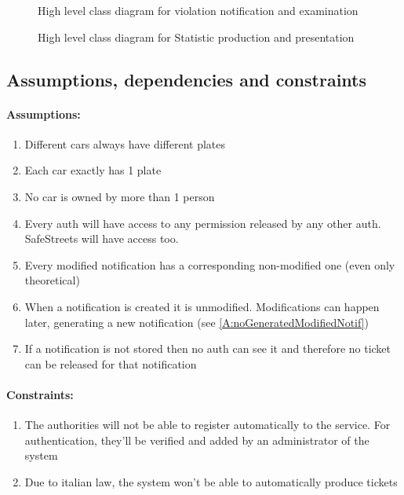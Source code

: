 \documentclass{article}
\newcommand{\enum}[1]{\texttt{#1.\arabic*}}
\begin{document}
		\begin{figure}[H]
			\centering
			\def\svgwidth{\columnwidth}
			
		\caption{High level class diagram for violation notification and examination}
		\end{figure}
				
		\begin{figure}[H]
			\centering
			\def\svgwidth{\columnwidth}
			
		\caption{High level class diagram for Statistic production and presentation}
		\end{figure}
			
	
	\subsection{Assumptions, dependencies and constraints}
	
	\paragraph{Assumptions:}
		\begin{enumerate}[label=\enum{A}]
			\item \label{A:disjPlates} Different cars always have different plates
			\item \label{A:Single plate}Each car exactly has 1 plate
			\item \label{A:singleOwner}No car is owned by more than 1 person
			\item \label{A:accessiblePermissions}Every auth will have access to any permission released by any other auth. SafeStreets will have access too.
			\item \label{A:noGeneratedModifiedNotif}Every modified notification has a corresponding non-modified one (even only theoretical)
			\item \label{A:newNotificationsAreNotModified}When a notification is created it is unmodified. Modifications can happen later, generating a new notification (see \ref{A:noGeneratedModifiedNotif})
			\item \label{A:authsNotClairvoyants}If a notification is not stored then no auth can see it and therefore no ticket can be released for that notification
		\end{enumerate}
	
	\paragraph{Constraints:}
		\begin{enumerate}[label=\enum{C}]
			\item The authorities will not be able to register automatically to the service. For authentication, they'll be verified and added by an administrator of the system
			\item \label{C:noAutoTickets}Due to italian law, the system won't be able to automatically produce tickets
		\end{enumerate}
	
\end{document}
